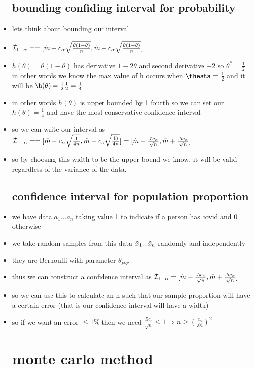 \documentclass{article}
\begin{document}
\begin{itemize}
\subsection{bounding confiding interval for probability}
\item lets think about bounding our interval
\item $\Tilde{\mathcal{I}}_{1-\alpha}==[\Tilde{m}-c_{\alpha}\sqrt{\frac{\theta(1-\theta)}{n}},\Tilde{m}+c_{\alpha}\sqrt{\frac{\theta(1-\theta)}{n}}]$
\item $h(\theta)=\theta(1-\theta)$ has derivative $1-2\theta$ and second derivative $-2$ so $\theta^{*}=\frac{1}{2}$ in other words we know the max value of h occurs when $\theata=$ $\frac{1}{2}$ and it will be $\h(\theta)=\frac{1}{2}\frac{1}{2}=\frac{1}{4}$
\item in other words $h(\theta)$ is upper bounded by 1 fourth so we can set our $h(\theta)=\frac{1}{4}$ and have the most conservative confidence interval
\item so we can write our interval as $\Tilde{\mathcal{I}}_{1-\alpha}==[\Tilde{m}-c_{\alpha}\sqrt{\frac{1}{4n}},\Tilde{m}+c_{\alpha}\sqrt{\frac{1)}{4n}}]=[\Tilde{m}-\frac{.5c_{\alpha}}{\sqrt{n}},\Tilde{m}+\frac{.5c_{\alpha}}{\sqrt{n}}]$ 
\item so by choosing this width to be the upper bound we know, it will be valid regardless of the variance of the data.
\subsection{confidence interval for population proportion }
\item we have data $a_1...a_n$ taking value 1 to indicate if a person has covid and 0 otherwise
\item we take random samples from  this data $\Tilde{x}_1...\Tilde{x}_n$ randomly and independently
\item they are Bernoulli with parameter $\theta_{pop}$
\item thus we can construct a confidence interval as $\Tilde{\mathcal{I}}_{1-\alpha}=[\Tilde{m}-\frac{.5c_{\alpha}}{\sqrt{n}},\Tilde{m}+\frac{.5c_{\alpha}}{\sqrt{n}}]$ 
\item so we can use this to calculate an n such that our sample proportion will have a certain error (that is our confidence interval will have a width)
\item so if we want an error $\leq 1\%$ then we need $\frac{.5c_{\alpha}}{\sqrt{n}}\leq 1\Rightarrow n\geq (\frac{c_{\alpha}}{.01})^2$
\section{monte carlo method}

\end{itemize}
\end{document}
